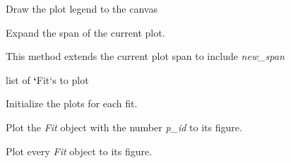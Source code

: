 \documentclass[a4paper,10pt,english]{sphinxmanual}
\begin{document}
\begin{fulllineitems}

\begin{fulllineitems}
\label{index:kafe.plot.Plot.draw_legend}
Draw the plot legend to the canvas

\end{fulllineitems}


\begin{fulllineitems}
\label{index:kafe.plot.Plot.extend_span}
Expand the span of the current plot.

This method extends the current plot span to include \emph{new\_span}

\end{fulllineitems}


\begin{fulllineitems}
\label{index:kafe.plot.Plot.fits}
list of {\color{red}\bfseries{}{}`}Fit{}`s to plot

\end{fulllineitems}


\begin{fulllineitems}
\label{index:kafe.plot.Plot.init_plots}
Initialize the plots for each fit.

\end{fulllineitems}


\begin{fulllineitems}
\label{index:kafe.plot.Plot.plot}
Plot the \emph{Fit} object with the number \emph{p\_id} to its figure.

\end{fulllineitems}


\begin{fulllineitems}
\label{index:kafe.plot.Plot.plot_all}
Plot every \emph{Fit} object to its figure.


\end{fulllineitems}
\end{fulllineitems}
\end{document}
